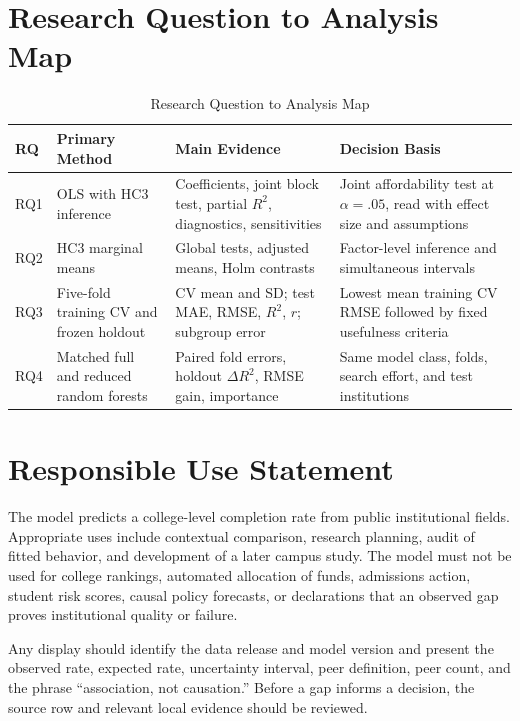 \documentclass[12pt,a4paper]{article}
\newcommand{\Rtwo}{\ensuremath{R^{2}}}
\newcommand{\DeltaRtwo}{\ensuremath{\Delta R^{2}}}
\begin{document}
\section{Research Question to Analysis Map}

\begin{table}[H]
\caption{Research Question to Analysis Map}\label{tab:rqmap}
\centering
\begin{tabularx}{\textwidth}{l>{\raggedright\arraybackslash}X>{\raggedright\arraybackslash}X>{\raggedright\arraybackslash}X}
\toprule
\textbf{RQ} & \textbf{Primary Method} & \textbf{Main Evidence} & \textbf{Decision Basis}\\
\midrule
RQ1 & OLS with HC3 inference & Coefficients, joint block test, partial \Rtwo, diagnostics, sensitivities & Joint affordability test at $\alpha=.05$, read with effect size and assumptions\\
\rowcolor{SoftGray}RQ2 & HC3 marginal means & Global tests, adjusted means, Holm contrasts & Factor-level inference and simultaneous intervals\\
RQ3 & Five-fold training CV and frozen holdout & CV mean and SD; test MAE, RMSE, \Rtwo, $r$; subgroup error & Lowest mean training CV RMSE followed by fixed usefulness criteria\\
\rowcolor{SoftGray}RQ4 & Matched full and reduced random forests & Paired fold errors, holdout \DeltaRtwo, RMSE gain, importance & Same model class, folds, search effort, and test institutions\\
\bottomrule
\end{tabularx}
\end{table}

\section{Responsible Use Statement}

The model predicts a college-level completion rate from public institutional fields. Appropriate uses include contextual comparison, research planning, audit of fitted behavior, and development of a later campus study. The model must not be used for college rankings, automated allocation of funds, admissions action, student risk scores, causal policy forecasts, or declarations that an observed gap proves institutional quality or failure.

Any display should identify the data release and model version and present the observed rate, expected rate, uncertainty interval, peer definition, peer count, and the phrase ``association, not causation.'' Before a gap informs a decision, the source row and relevant local evidence should be reviewed.
\end{document}
